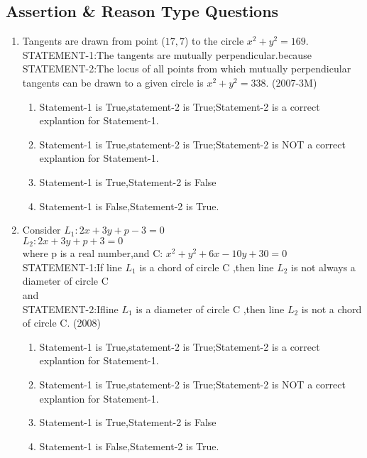 \documentclass[journal,12pt,twocolumn]{IEEEtran}
\theoremstyle{remark}
\begin{document}
\subsection{Assertion \& Reason Type Questions}
\begin{enumerate}
\item Tangents are drawn from point ($17,7$) to the circle $x^2+y^2=169$.\\
STATEMENT-1:The tangents are mutually perpendicular.because\\
STATEMENT-2:The locus of all points from which mutually perpendicular tangents can be drawn to a given circle is $x^2+y^2=338.$ \hfill{(2007-3M)}\\
\begin{enumerate}
\item Statement-1 is True,statement-2 is True;Statement-2 is a correct explantion for Statement-1.\\
\item Statement-1 is True,statement-2 is True;Statement-2 is NOT a correct explantion for Statement-1.\\
\item Statement-1 is True,Statement-2 is False\\
\item Statement-1 is False,Statement-2 is True.\\
\end{enumerate}

\item Consider $L_1:2x+3y+p-3=0$\\
               $L_2:2x+3y+p+3=0$\\
where p is a real number,and C: $x^2+y^2+6x-10y+30=0$\\
STATEMENT-1:If line $L_1$ is a chord of circle C ,then line $L_2$ is not always a diameter of circle C\\
and\\
STATEMENT-2:Ifline $L_1$ is a diameter of circle C ,then line $L_2$ is not a chord  of circle C. \hfill{(2008)}\\
\begin{enumerate}
\item Statement-1 is True,statement-2 is True;Statement-2 is a correct explantion for Statement-1.\\
\item Statement-1 is True,statement-2 is True;Statement-2 is NOT a correct explantion for Statement-1.\\
\item Statement-1 is True,Statement-2 is False\\
\item Statement-1 is False,Statement-2 is True.\\
\end{enumerate}
\end{enumerate}
\end{document}
